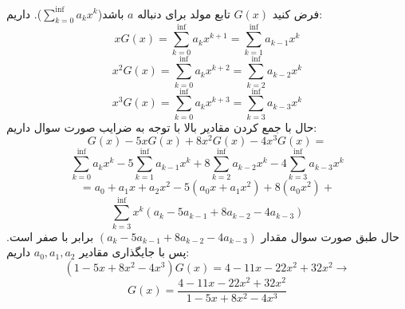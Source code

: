 \p
    فرض کنید $G(x)$ تابع مولد برای دنباله $a$ باشد($\sum_{k=0}^{\inf} a_k x^k$). داریم:
    $$x G(x) = \sum_{k=0}^{\inf} a_k x^{k+1} = \sum_{k=1}^{\inf} a_{k-1}x^{k}$$
    $$x^2G(x) = \sum_{k=0}^{\inf} a_k x^{k+2} = \sum_{k=2}^{\inf} a_{k-2}x^{k}$$
    $$x^3G(x) = \sum_{k=0}^{\inf} a_k x^{k+3} = \sum_{k=3}^{\inf} a_{k-3}x^{k}$$
    حال با جمع کردن مقادیر بالا با توجه به ضرایب صورت سوال داریم:
    $$G(x) - 5x G(x) + 8x^2G(x) - 4x^3G(x) = $$
    $$\sum_{k=0}^{\inf} a_k x^k - 5\sum_{k=1}^{\inf} a_{k-1}x^{k} + 8\sum_{k=2}^{\inf} a_{k-2}x^{k} - 4\sum_{k=3}^{\inf} a_{k-3}x^{k}$$
    $$= a_0 + a_1x + a_2x^2 - 5(a_0x + a_1x^2) + 8(a_0x^2) + $$
    $$ \sum_{k=3}^{\inf} x^k(a_k - 5a_{k-1} + 8a_{k-2} - 4a_{k-3})$$
    حال طبق صورت سوال مقدار $(a_k - 5a_{k-1} + 8a_{k-2} - 4a_{k-3})$ برابر با صفر است. پس با جایگذاری مقادیر $a_0, a_1, a_2$ داریم:
    $$(1 - 5x + 8x^2 - 4x^3) G(x) = 4 - 11x - 22x^2 + 32x^2 \rightarrow$$
    $$G(x) = \frac{4 - 11x - 22x^2 + 32x^2}{1 - 5x + 8x^2 - 4x^3}$$


